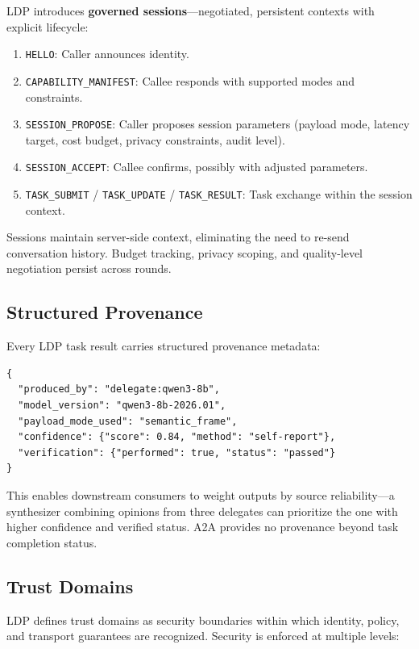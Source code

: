 \documentclass[11pt,a4paper]{article}
\newcommand{\ldp}{\textsc{LDP}}
\newcommand{\atoa}{\textsc{A2A}}
\begin{document}
\ldp{} introduces \textbf{governed sessions}---negotiated, persistent contexts with explicit lifecycle:

\begin{enumerate}[leftmargin=*]
\item \texttt{HELLO}: Caller announces identity.
\item \texttt{CAPABILITY\_MANIFEST}: Callee responds with supported modes and constraints.
\item \texttt{SESSION\_PROPOSE}: Caller proposes session parameters (payload mode, latency target, cost budget, privacy constraints, audit level).
\item \texttt{SESSION\_ACCEPT}: Callee confirms, possibly with adjusted parameters.
\item \texttt{TASK\_SUBMIT} / \texttt{TASK\_UPDATE} / \texttt{TASK\_RESULT}: Task exchange within the session context.
\end{enumerate}

Sessions maintain server-side context, eliminating the need to re-send conversation history. Budget tracking, privacy scoping, and quality-level negotiation persist across rounds.

\subsection{Structured Provenance}
\label{sec:provenance}

Every \ldp{} task result carries structured provenance metadata:

\begin{lstlisting}[style=protocol]
{
  "produced_by": "delegate:qwen3-8b",
  "model_version": "qwen3-8b-2026.01",
  "payload_mode_used": "semantic_frame",
  "confidence": {"score": 0.84, "method": "self-report"},
  "verification": {"performed": true, "status": "passed"}
}
\end{lstlisting}

This enables downstream consumers to weight outputs by source reliability---a synthesizer combining opinions from three delegates can prioritize the one with higher confidence and verified status. \atoa{} provides no provenance beyond task completion status.

\subsection{Trust Domains}
\label{sec:trust}

\ldp{} defines trust domains as security boundaries within which identity, policy, and transport guarantees are recognized. Security is enforced at multiple levels:
\end{document}
